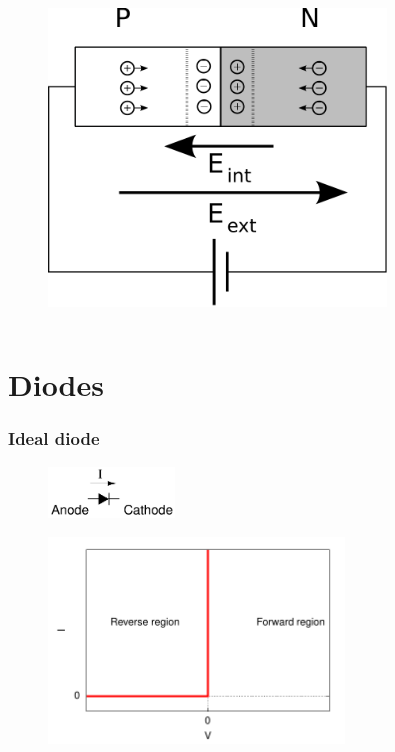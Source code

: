 \documentclass[beamer]{standalone}
\begin{document}
{\begin{columns}[t]
\begin{column}
    \begin{figure}
      \includegraphics[width=0.80\textwidth]{./pics/pnjunction_forward_bias}
    \end{figure}
  \end{column}
\end{columns}
  }

  
\section{Diodes}

\frame
{ \frametitle{Ideal diode}
\begin{figure}
  \includegraphics[width=0.30\textwidth]{./schematics/diode}
\end{figure}
\begin{figure}
  \includegraphics[angle=0,width=0.70\textwidth]{./plots/ideal_diode}
\end{figure}
}
\end{document}
